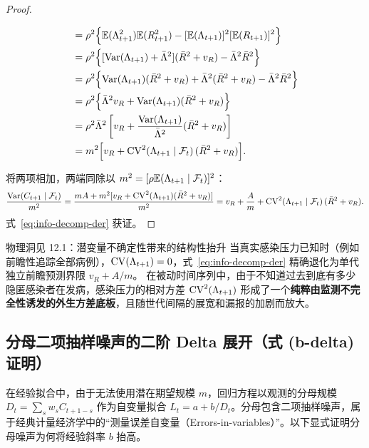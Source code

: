 \begin{proof}
\begin{enumerate}
\begin{align}
    &= \rho^2 \Big\{ \mathbb{E}(\Lambda_{t+1}^2) \mathbb{E}(R_{t+1}^2) - [\mathbb{E}(\Lambda_{t+1})]^2 [\mathbb{E}(R_{t+1})]^2 \Big\} \nonumber \\
    &= \rho^2 \Big\{ [\mathrm{Var}(\Lambda_{t+1}) + \bar{\Lambda}^2](\bar{R}^2 + v_R) - \bar{\Lambda}^2 \bar{R}^2 \Big\} \nonumber \\
    &= \rho^2 \Big\{ \mathrm{Var}(\Lambda_{t+1})(\bar{R}^2 + v_R) + \bar{\Lambda}^2(\bar{R}^2 + v_R) - \bar{\Lambda}^2 \bar{R}^2 \Big\} \nonumber \\
    &= \rho^2 \Big\{ \bar{\Lambda}^2 v_R + \mathrm{Var}(\Lambda_{t+1})(\bar{R}^2 + v_R) \Big\} \nonumber \\
    &= \rho^2 \bar{\Lambda}^2 \left[ v_R + \frac{\mathrm{Var}(\Lambda_{t+1})}{\bar{\Lambda}^2}(\bar{R}^2 + v_R) \right] \nonumber \\
    &= m^2 \Big[ v_R + \mathrm{CV}^2(\Lambda_{t+1} \mid \mathcal{F}_t)\,(\bar{R}^2 + v_R) \Big].
  \end{align}
\end{enumerate}
将两项相加，两端同除以 $m^2 = [\rho \mathbb{E}(\Lambda_{t+1} \mid \mathcal{F}_t)]^2$：
\begin{equation}
  \frac{\mathrm{Var}(C_{t+1} \mid \mathcal{F}_t)}{m^2} = \frac{m A + m^2 [v_R + \mathrm{CV}^2(\Lambda_{t+1})(\bar{R}^2+v_R)]}{m^2} = v_R + \frac{A}{m} + \mathrm{CV}^2(\Lambda_{t+1} \mid \mathcal{F}_t)\,(\bar{R}^2 + v_R).
\end{equation}
式~\eqref{eq:info-decomp-der} 获证。
\end{proof}

\begin{insightbox}{物理洞见 12.1：潜变量不确定性带来的结构性抬升}
当真实感染压力已知时（例如前瞻性追踪全部病例），$\mathrm{CV}(\Lambda_{t+1}) = 0$，式~\eqref{eq:info-decomp-der} 精确退化为单代独立前瞻预测界限 $v_R + A/m$。
在被动时间序列中，由于不知道过去到底有多少隐匿感染者在发病，感染压力的相对方差 $\mathrm{CV}^2(\Lambda_{t+1})$ 形成了一个\textbf{纯粹由监测不完全性诱发的外生方差底板}，且随世代间隔的展宽和漏报的加剧而放大。
\end{insightbox}

\subsection{分母二项抽样噪声的二阶 Delta 展开（式 (b-delta) 证明）}

在经验拟合中，由于无法使用潜在期望规模 $m$，回归方程以观测的分母规模 $D_t = \sum_s w_s C_{t+1-s}$ 作为自变量拟合 $L_t = a + b/D_t$。分母包含二项抽样噪声，属于经典计量经济学中的“测量误差自变量（Errors-in-variables）”。以下显式证明分母噪声为何将经验斜率 $b$ 抬高。

